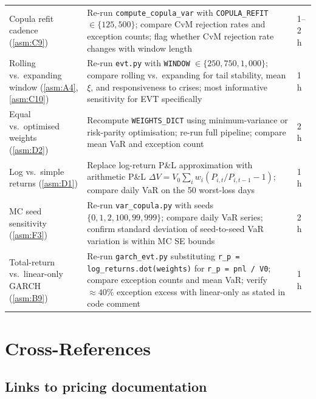 \documentclass[11pt,a4paper]{article}
\newcommand{\code}[1]{\texttt{#1}}
\begin{document}
\begin{tabularx}{\textwidth}{@{}p{3.8cm} X p{2.0cm}@{}}
Copula refit cadence (\cref{asm:C9}) &
Re-run \code{compute\_copula\_var} with \code{COPULA\_REFIT}
$\in \{125, 500\}$; compare CvM rejection rates and exception counts;
flag whether CvM rejection rate changes with window length &
1--2 h \\[4pt]

Rolling vs.\ expanding window (\cref{asm:A4}, \cref{asm:C10}) &
Re-run \code{evt.py} with \code{WINDOW}
$\in \{250, 750, 1{,}000\}$; compare rolling vs.\ expanding for
tail stability, mean $\xi$, and responsiveness to crises;
most informative sensitivity for EVT specifically &
1 h \\[4pt]

Equal vs.\ optimised weights (\cref{asm:D2}) &
Recompute \code{WEIGHTS\_DICT} using minimum-variance or risk-parity
optimisation; re-run full pipeline; compare mean VaR and exception count &
2 h \\[4pt]

Log vs.\ simple returns (\cref{asm:D1}) &
Replace log-return P\&L approximation with arithmetic P\&L
$\Delta V = V_0 \sum_i w_i (P_{i,t}/P_{i,t-1} - 1)$;
compare daily VaR on the 50 worst-loss days &
1 h \\[4pt]

MC seed sensitivity (\cref{asm:F3}) &
Re-run \code{var\_copula.py} with seeds
$\{0, 1, 2, 100, 99{,}999\}$; compare daily VaR series;
confirm standard deviation of seed-to-seed VaR variation
is within MC SE bounds &
2 h \\[4pt]

Total-return vs.\ linear-only GARCH (\cref{asm:B9}) &
Re-run \code{garch\_evt.py} substituting \code{r\_p = log\_returns.dot(weights)}
for \code{r\_p = pnl / V0}; compare exception counts and mean VaR;
verify $\approx 40\%$ exception excess with linear-only as stated in
code comment &
1 h \\[4pt]

\bottomrule
\end{tabularx}

\section{Cross-References}\label{sec:cross-references}

\subsection{Links to pricing documentation}
\end{document}
